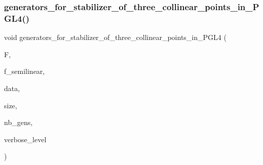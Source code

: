 \subsubsection{\texorpdfstring{generators\+\_\+for\+\_\+stabilizer\+\_\+of\+\_\+three\+\_\+collinear\+\_\+points\+\_\+in\+\_\+\+P\+G\+L4()}{generators\_for\_stabilizer\_of\_three\_collinear\_points\_in\_PGL4()}}
{\footnotesize\ttfamily void generators\+\_\+for\+\_\+stabilizer\+\_\+of\+\_\+three\+\_\+collinear\+\_\+points\+\_\+in\+\_\+\+P\+G\+L4 (\begin{DoxyParamCaption}\item[{\mbox{\hyperlink{classfinite__field}{finite\+\_\+field}} $\ast$}]{F,  }\item[{\mbox{\hyperlink{galois_8h_a09fddde158a3a20bd2dcadb609de11dc}{I\+NT}}}]{f\+\_\+semilinear,  }\item[{\mbox{\hyperlink{galois_8h_a09fddde158a3a20bd2dcadb609de11dc}{I\+NT}} $\ast$\&}]{data,  }\item[{\mbox{\hyperlink{galois_8h_a09fddde158a3a20bd2dcadb609de11dc}{I\+NT}} \&}]{size,  }\item[{\mbox{\hyperlink{galois_8h_a09fddde158a3a20bd2dcadb609de11dc}{I\+NT}} \&}]{nb\+\_\+gens,  }\item[{\mbox{\hyperlink{galois_8h_a09fddde158a3a20bd2dcadb609de11dc}{I\+NT}}}]{verbose\+\_\+level }\end{DoxyParamCaption})}

\mbox{\label{group__generators_8_c_a4cf455d28dad04ddc0007b0626595876}} 
